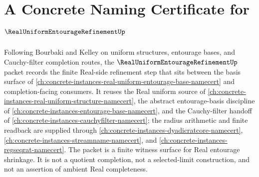 \chapter{A Concrete Naming Certificate for $\RealUniformEntourageRefinementUp$}
\label{ch:concrete-instances-real-uniform-entourage-refinement-namecert}

Following Bourbaki and Kelley on uniform structures, entourage bases, and Cauchy-filter completion routes, the $\RealUniformEntourageRefinementUp$ packet records the finite Real-side refinement step that sits between the basis surface of \autoref{ch:concrete-instances-real-uniform-entourage-base-namecert} and completion-facing consumers. It reuses the Real uniform source of \autoref{ch:concrete-instances-real-uniform-structure-namecert}, the abstract entourage-basis discipline of \autoref{ch:concrete-instances-entourage-base-namecert}, and the Cauchy-filter handoff of \autoref{ch:concrete-instances-cauchyfilter-namecert}; the radius arithmetic and finite readback are supplied through \autoref{ch:concrete-instances-dyadicratcore-namecert}, \autoref{ch:concrete-instances-streamname-namecert}, and \autoref{ch:concrete-instances-regseqrat-namecert}. The packet is a finite witness surface for Real entourage shrinkage. It is not a quotient completion, not a selected-limit construction, and not an assertion of ambient Real completeness.

